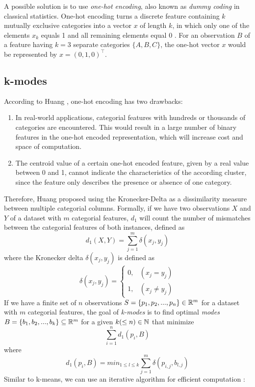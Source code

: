 A possible solution is to use \textit{one-hot encoding}, also known as \textit{dummy coding} in classical statistics. One-hot encoding turns a discrete feature containing $k$ mutually exclusive categories into a vector $x$ of length $k$, in which only one of the elements $x_k$ equals 1 and all remaining elements equal 0 \cite{bishop_2006}. For an observation $B$ of a feature having $k=3$ separate categories $\{A, B, C\}$, the one-hot vector $x$ would be represented by $x = (0, 1, 0)^{\intercal}$.

\subsection{k-modes} \label{k-modes}

According to Huang \cite{kmodes}, one-hot encoding has two drawbacks:
\begin{enumerate} 
	\item In real-world applications, categorial features with hundreds or thousands of categories are encountered. This would result in a large number of binary features in the one-hot encoded representation, which will increase cost and space of computation.
	\item The centroid value of a certain one-hot encoded feature, given by a real value between 0 and 1, cannot indicate the characteristics of the according cluster, since the feature only describes the presence or absence of one category.
\end{enumerate}
Therefore, Huang \cite{kmodes} proposed using the Kronecker-Delta as a dissimilarity measure between multiple categorial columns. Formally, if we have two observations $X$ and $Y$ of a dataset with $m$ categorial features, $d_1$ will count the number of mismatches between the categorial features of both instances, defined as
$$d_1(X, Y) = \sum^m_{j=1} \delta (x_j, y_j)$$
where the Kronecker delta $\delta (x_j, y_j)$ is defined as
$$\delta (x_j, y_j) = 
\begin{cases}
    0, & (x_j = y_j)\\
    1, & (x_j \neq y_j)
\end{cases}$$
If we have a finite set of $n$ observations $S=\{p_1, p_2, ..., p_n\} \in \mathbb{R}^m$ for a dataset with $m$ categorial features, the goal of \textit{k-modes} \cite{kmodes} is to find optimal \textit{modes} $B=\{b_1, b_2, ..., b_k\} \subseteq \mathbb{R}^m$ for a given $k (\leq n) \in \mathbb{N}$ that minimize
$$\sum_{i=1}^n  d_1(p_i, B)$$
where
$$d_1(p_i, B) = min_{1 \leq l \leq k} \sum^m_{j=1} \delta (p_{i,j}, b_{l,j})$$
Similar to k-means, we can use an iterative algorithm for efficient computation \cite{kmodes}:
